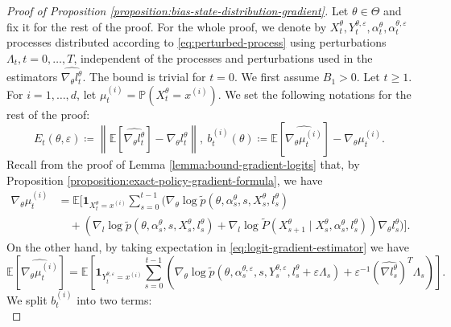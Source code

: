 \documentclass[11pt]{article}
\numberwithin{equation}{section}
\theoremstyle{definition}
\theoremstyle{remark}
\def\eps{\varepsilon}
\begin{document}
\begin{proof}[Proof of Proposition \ref{proposition:bias-state-distribution-gradient}]
    Let $\theta \in \Theta$ and fix it for the rest of the proof.
    For the whole proof, we denote by $X_t^{\theta}, Y_t^{\theta, \eps}, \alpha_t^{\theta}, \alpha_t^{\theta, \eps}$ processes distributed according to \eqref{eq:perturbed-process} using perturbations $\Lambda_t, t = 0, \ldots, T$,
    independent of the processes and perturbations used in the estimators $\widehat{\nabla_\theta l_t^\theta}$.
    The bound is trivial for $t = 0$.
    We first assume $B_1 > 0$.
    Let $t \geq 1$.
    For $i = 1, \ldots, d$, let $\mu^{(i)}_t = \mathbb P(X_t^\theta = x^{(i)})$.
    We set the following notations for the rest of the proof:
    \begin{equation}
        \label{eq:bias-notation}
    E_t(\theta, \eps) \coloneq \left\| \mathbb E \left[ \widehat{\nabla_{\theta} l_t^\theta} \right] - \nabla_\theta l_t^\theta \right\|, \: b_t^{(i)}(\theta) \coloneq  \mathbb E \left[ \widehat{\nabla_{\theta} \mu_t^{(i)}} \right] - \nabla_\theta \mu^{(i)}_t.
    \end{equation}
    Recall from the proof of Lemma \ref{lemma:bound-gradient-logits} that, by Proposition \ref{proposition:exact-policy-gradient-formula}, we have
    \[
    \begin{aligned}
    \nabla_\theta \mu^{(i)}_t &= \mathbb E \Bigg[
        \mathbf 1_{X_t^\theta = x^{(i)}} \sum_{s = 0}^{t-1} \Big(
            \nabla_\theta \log \tilde p (\theta, \alpha_s^\theta, s,X_s^\theta, l_s^\theta) \\
            &\quad + \left(\nabla_l \log \tilde p(\theta, \alpha_s^\theta, s,X_s^\theta, l_s^\theta)
            + \nabla_l \log \tilde P(X_{s + 1}^\theta \mid X_s^\theta, \alpha_s^\theta, l_s^\theta) \right) \nabla_\theta l_s^\theta
            \Big)
            \Bigg].
    \end{aligned}
\]
On the other hand, by taking expectation in \eqref{eq:logit-gradient-estimator} we have
\[
    \mathbb E \left[ \widehat{\nabla_{\theta} \mu_t^{(i)}} \right] = \mathbb E \left[ 
         \mathbf 1_{Y_t^{\theta, \eps}=x^{(i)}} 
         \sum_{s = 0}^{t-1} \left(
            \nabla_\theta \log \tilde p (\theta, \alpha_s^{\theta, \eps}, s,Y_s^{\theta, \eps}, l_s^{\theta} + \eps \Lambda_s) 
            + \eps^{-1} \left(\widehat{\nabla l_s^\theta}\right)^T \Lambda_s 
            \right)
         \right].
\]
We split $b_t^{(i)}$ into two terms:
\begin{equation}
\label{eq:bt-decomposition}

\end{equation}
\end{proof}
\end{document}
